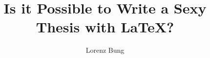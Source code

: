 \documentclass[]{htwg-report}
\begin{document}
\frontmatter



\title[Is it Possible to Write a Sexy Thesis with LaTeX?]{Is it Possible to Write a Sexy Thesis with LaTeX?}

\author{Lorenz Bung}
\newcommand{\verfasser}{Lorenz Bung}
\newcommand{\thema}{Is it Possible to Write a Sexy Thesis with LaTeX?}
\newcommand{\dob}{26.06.1997}
\newcommand{\birthplace}{Konstanz}
\newcommand{\hochschule}{Hochschule für Technik, Wirtschaft und Gestaltung}
\newcommand{\institut}{Isys Vision GmbH}
\newcommand{\prueferA}{Prof. Dr. Georg Umlauf}
\newcommand{\prueferB}{Simon Schmei{\ss}er}
\newcommand{\ausgabedatum}{01.04.2020}
\newcommand{\abgabedatum}{30.06.2020}
\newcommand{\type}{Bachelor}
\newcommand{\typeshortcut}{B}
\newcommand{\studiengang}{Angewandte Informatik}
\newcommand{\strasse}{Banater Str. 9}
\newcommand{\wohnort}{78467 Konstanz}
\newcommand{\schlagworte}{Deep learning, Machine Vision}


\makecover[]
%          






\tableofcontents

\mainmatter



\appendix

%

\printbibliography[heading=bibintoc]
\end{document}
